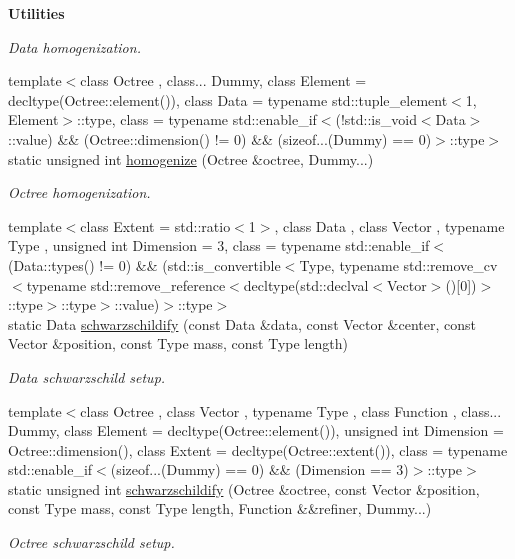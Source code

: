 \begin{Indent}{\bf Utilities}
\begin{DoxyCompactItemize}
\begin{DoxyCompactList}\small\item\em Data homogenization. \end{DoxyCompactList}\item 
{\footnotesize template$<$class Octree , class... Dummy, class Element  = decltype(\-Octree\-::element()), class Data  = typename std\-::tuple\-\_\-element$<$1, Element$>$\-::type, class  = typename std\-::enable\-\_\-if$<$(!std\-::is\-\_\-void$<$\-Data$>$\-::value) \&\& (\-Octree\-::dimension() != 0) \&\& (sizeof...(\-Dummy) == 0)$>$\-::type$>$ }\\static unsigned int \hyperlink{exceptionInput_ad9324e1d7cbb6ce11dae87e7805ab1f0}{homogenize} (Octree \&octree, Dummy...)
\begin{DoxyCompactList}\small\item\em Octree homogenization. \end{DoxyCompactList}\item 
{\footnotesize template$<$class Extent  = std\-::ratio$<$1$>$, class Data , class Vector , typename Type , unsigned int Dimension = 3, class  = typename std\-::enable\-\_\-if$<$(\-Data\-::types() != 0) \&\& (std\-::is\-\_\-convertible$<$\-Type, typename std\-::remove\-\_\-cv$<$typename std\-::remove\-\_\-reference$<$decltype(std\-::declval$<$\-Vector$>$()\mbox{[}0\mbox{]})$>$\-::type$>$\-::type$>$\-::value)$>$\-::type$>$ }\\static Data \hyperlink{exceptionInput_aab3a37812389169923cbbbf922d9ca1c}{schwarzschildify} (const Data \&data, const Vector \&center, const Vector \&position, const Type mass, const Type length)
\begin{DoxyCompactList}\small\item\em Data schwarzschild setup. \end{DoxyCompactList}\item 
{\footnotesize template$<$class Octree , class Vector , typename Type , class Function , class... Dummy, class Element  = decltype(\-Octree\-::element()), unsigned int Dimension = Octree\-::dimension(), class Extent  = decltype(\-Octree\-::extent()), class  = typename std\-::enable\-\_\-if$<$(sizeof...(\-Dummy) == 0) \&\& (\-Dimension == 3)$>$\-::type$>$ }\\static unsigned int \hyperlink{exceptionInput_a881b5694e1b8defc21d34d35cbec74d4}{schwarzschildify} (Octree \&octree, const Vector \&position, const Type mass, const Type length, Function \&\&refiner, Dummy...)
\begin{DoxyCompactList}\small\item\em Octree schwarzschild setup. \end{DoxyCompactList}\end{DoxyCompactItemize}
\end{Indent}
